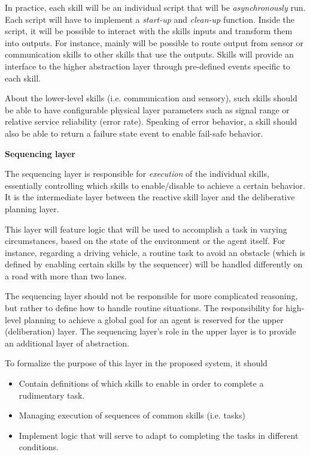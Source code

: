 \documentclass[main.tex]{subfiles}
\begin{document}
In practice, each skill will be an individual script that will be \emph{asynchronously} run.
Each script will have to implement a \emph{start-up} and \emph{clean-up} function.
Inside the script, it will be possible to interact with the skills inputs and transform them into 
outputs. For instance, mainly will be possible to route output from sensor or communication skills
to other skills that use the outputs. Skills will provide an interface to the higher abstraction layer 
through pre-defined events specific to each skill.

About the lower-level skills (i.e. communication and sensory), such skills should be 
able to have configurable physical layer parameters such as signal range or relative service
reliability (error rate). Speaking of error behavior, a skill should also be able to return a
failure state event to enable fail-safe behavior. 

\textbf{Sequencing layer}

The sequencing layer is responsible for \emph{execution} of the individual skills, essentially 
controlling which skills to enable/disable to achieve a certain behavior. It is the 
intermediate layer between the reactive skill layer and the deliberative planning layer. 

This layer will feature logic that will be used to accomplish a task in varying circumstances, 
based on the state of the environment or the agent itself. For instance, regarding a driving 
vehicle, a routine task to avoid an obstacle (which is defined by enabling certain skills by
the sequencer) will be handled differently on a road with more than two lanes.

The sequencing layer should not be responsible for more complicated reasoning, but rather 
to define how to handle routine situations. The responsibility for high-level planning to achieve 
a global goal for an agent is reserved for the upper (deliberation) layer. The sequencing layer's 
role in the upper layer is to provide an additional layer of abstraction.

To formalize the purpose of this layer in the proposed system, it should 

\begin{itemize}
    \item Contain definitions of which skills to enable in order to complete a rudimentary task.
    \item Managing execution of sequences of common skills (i.e. tasks)
    \item Implement logic that will serve to adapt to completing the tasks in different conditions.
\end{itemize}
\end{document}
